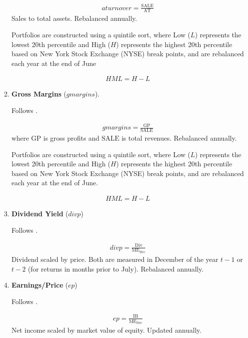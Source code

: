 \begin{enumerate}
	\begin{align*}
		aturnover = \frac{ \mathrm{SALE} }{ \mathrm{AT} }
	\end{align*}	
	Sales to total assets. Rebalanced annually.
	
	Portfolios are constructed using a quintile sort, where Low ($L$) represents the lowest 20th percentile and High ($H$) represents the highest 20th percentile based on New York Stock Exchange (NYSE) break points, and are rebalanced each year at the end of June
	
	\begin{align*}
		HML = H - L
	\end{align*}
	
	
	
	\item \textbf{Gross Margins} ($gmargins$). 
	
	Follows .
	
	\begin{align*}
		gmargins = \frac{ \mathrm{GP} }{ \mathrm{SALE} }
	\end{align*}
	where $\mathrm{GP}$ is gross profits and $\mathrm{SALE}$ is total revenues. Rebalanced annually.
	
	Portfolios are constructed using a quintile sort, where Low ($L$) represents the lowest 20th percentile and High ($H$) represents the highest 20th percentile based on New York Stock Exchange (NYSE) break points, and are rebalanced each year at the end of June.
		
	\begin{align*}
		HML = H - L
	\end{align*}
	 
	 
	 
	\item \textbf{Dividend Yield} ($divp$) 
	
	Follows . 
	
	\begin{align*}
		divp = \frac{ \mathrm{Div} }{ \mathrm{ME}_{\text{Dec}} }
	\end{align*}
	Dividend scaled by price. Both are measured in December of the year $t-1$ or $t-2$ (for returns in months prior to July). Rebalanced annually.
	
	
	
	\item \textbf{Earnings/Price} ($ep$)
	
	Follows .
	
	\begin{align*}
		ep = \frac{ \mathrm{IB} }{ \mathrm{ME}_{\text{Dec}} }
	\end{align*}
	Net income scaled by market value of equity. Updated annually.
	

\end{enumerate}
